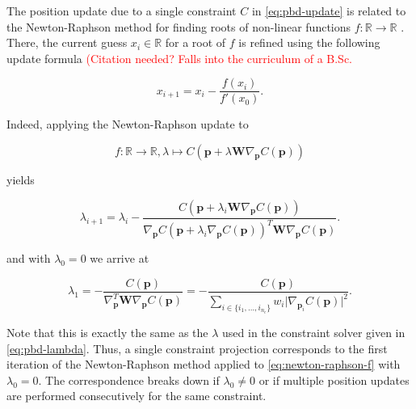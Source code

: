 The position update due to a single constraint $C$ in \cref{eq:pbd-update} is related to the Newton-Raphson method for finding roots of non-linear 
functions $f \colon \mathbb{R} \to \mathbb{R}$ \cite{mueller2006}. There, the current guess $x_i \in \mathbb{R}$ for a root of $f$ is refined 
using the following update formula \textcolor{red}{(Citation needed? Falls into the curriculum of a B.Sc.\)}

\begin{equation}\label{eq:newton-raphson}
    x_{i+1} = x_i - \frac{f(x_i)}{f\prime(x_0)}.
\end{equation}

\noindent Indeed, applying the Newton-Raphson update to 

\begin{equation}\label{eq:newton-raphson-f}
    f \colon \mathbb{R} \to \mathbb{R}, \lambda \mapsto C(\bm{p} + \lambda \bm{W} \nabla_{\bm{p}} C(\bm{p}))
\end{equation}

\noindent yields

\[
    \lambda_{i+1} = \lambda_i - \frac{C(\bm{p} + \lambda_i \bm{W} \nabla_{\bm{p}} C(\bm{p}))}
    {\nabla_{\bm{p}}C(\bm{p} + \lambda_i \nabla_{\bm{p}}C(\bm{p}))^T \bm{W} \nabla_{\bm{p}} C(\bm{p})}.
\]

\noindent and with $\lambda_0 = 0$ we arrive at 

\[
    \lambda_1 = -\frac{C(\bm{p})}{\nabla_{\bm{p}}^T \bm{W} \nabla_{\bm{p}} C(\bm{p})}
    = - \frac{C(\bm{p})}{\sum_{i \in \{ i_1, \ldots, i_{n_c} \}} w_i \vert \nabla_{\bm{p}_i} C(\bm{p}) \vert^2}.
\]

\noindent Note that this is exactly the same as the $\lambda$ used in the constraint solver given in \cref{eq:pbd-lambda}. Thus, a single 
constraint projection corresponds to the first iteration of the Newton-Raphson method applied to \cref{eq:newton-raphson-f} with 
$\lambda_0 = 0$. The correspondence breaks down if $\lambda_0 \neq 0$ or if multiple position updates are performed consecutively for the 
same constraint.

